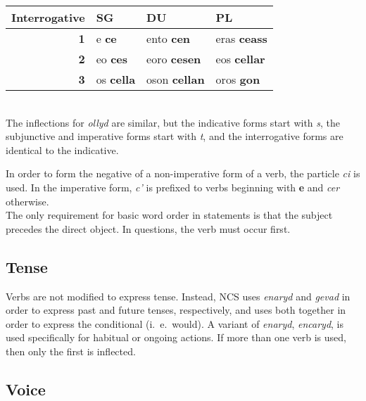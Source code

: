 \begin{center}
\begin{tabular}{|r|l|l|l|}
    \textbf{Interrogative} & \textbf{SG} & \textbf{DU} & \textbf{PL} \\ \hline
    \textbf{1} & e \textbf{ce} & ento \textbf{cen} & eras \textbf{ceass} \\ \hline
    \textbf{2} & eo \textbf{ces} & eoro \textbf{cesen} & eos \textbf{cellar} \\ \hline
    \textbf{3} & os \textbf{cella} & oson \textbf{cellan} & oros \textbf{gon} \\ \hline
  \end{tabular} \\
  The inflections for \emph{ollyd} are similar, but the indicative forms start with \emph{s}, the subjunctive and imperative forms start with \emph{t}, and the interrogative forms are identical to the indicative.
\end{center}

In order to form the negative of a non-imperative form of a verb, the particle \emph{ci} is used. In the imperative form, \emph{c'} is prefixed to verbs beginning with \textbf{e} and \emph{cer} otherwise. \\

The only requirement for basic word order in statements is that the subject precedes the direct object. In questions, the verb must occur first. \\

\subsection{Tense}

Verbs are not modified to express tense. Instead, NCS uses \emph{enaryd} and \emph{gevad} in order to express past and future tenses, respectively, and uses both together in order to express the conditional (i.~e.~would). A variant of \emph{enaryd}, \emph{encaryd}, is used specifically for habitual or ongoing actions. If more than one verb is used, then only the first is inflected.

\subsection{Voice}

